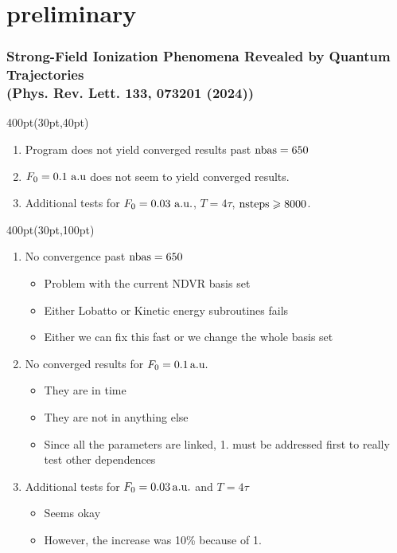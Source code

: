 \section{preliminary}

\begin{frame}
\frametitle{Strong-Field Ionization Phenomena Revealed by Quantum Trajectories \\
\small (Phys. Rev. Lett. \textbf{133}, 073201 (2024))}

\footnotesize


\begin{textblock*}{400pt}(30pt,40pt)

\begin{enumerate}
\footnotesize
\item Program does not yield converged results past ${\rm nbas}=650$
\item $F_0 = 0.1\ \rm a.u$ does not seem to yield converged results. 
\item Additional tests for $F_0 = 0.03\ \rm a.u.$, 
      $T=4\tau$, ${\rm nsteps} \geqslant 8000$.
\end{enumerate}
\end{textblock*}


\begin{textblock*}{400pt}(30pt,100pt)
  \begin{enumerate}
  \footnotesize
\item No convergence past ${\rm nbas}=650$
  \begin{itemize}
  \footnotesize
    \item[$\bullet$] Problem with the current NDVR basis set 
    \item[$\bullet$] Either Lobatto or Kinetic energy subroutines fails
    \item[$\bullet$] Either we can fix this fast 
              or we change the whole basis set
  \end{itemize}
\item No converged results for $F_0 = 0.1\,\rm a.u.$
  \begin{itemize}
  \footnotesize
    \item[$\bullet$] They are in time
    \item[$\bullet$] They are not in anything else
    \item[$\bullet$] Since all the parameters are linked, 
              1. must be addressed first to really test other dependences
  \end{itemize}
\item Additional tests for $F_0 = 0.03\,\rm a.u.$ and $T=4\tau$
  \begin{itemize}
  \footnotesize
    \item[$\bullet$] Seems okay
    \item[$\bullet$] However, the increase was 10\% because of 1.
  \end{itemize}
  \end{enumerate}


\end{textblock*}
\end{frame}
